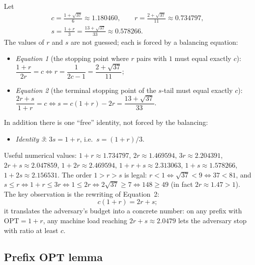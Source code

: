 \documentclass[11pt]{article}
\theoremstyle{definition}
\newcommand{\opt}{\mathrm{OPT}}
\begin{document}
Let
\begin{gather*}
c=\frac{1+\sqrt{37}}{6}\approx1.180460,\qquad
r=\frac{2+\sqrt{37}}{11}\approx0.734797,\\
s=\frac{1+r}{3}=\frac{13+\sqrt{37}}{33}\approx0.578266 .
\end{gather*}
The values of $r$ and $s$ are not guessed; each is forced by a balancing
equation:
\begin{itemize}
\item \emph{Equation 1} (the stopping point where $r$ pairs with $1$ must
equal exactly $c$):
$\dfrac{1+r}{2r}=c\iff r=\dfrac{1}{2c-1}=\dfrac{2+\sqrt{37}}{11}$;
\item \emph{Equation 2} (the terminal stopping point of the $s$-tail must
equal exactly $c$):
$\dfrac{2r+s}{1+r}=c\iff s=c(1+r)-2r=\dfrac{13+\sqrt{37}}{33}$.
\end{itemize}
In addition there is one ``free'' identity, not forced by the balancing:
\begin{itemize}
\item \emph{Identity 3}: $3s=1+r$, i.e.\ $s=(1+r)/3$.
\end{itemize}
Useful numerical values:
$1+r\approx1.734797$, $2r\approx1.469594$, $3r\approx2.204391$,
$2r+s\approx2.047859$, $1+2r\approx2.469594$, $1+r+s\approx2.313063$,
$1+s\approx1.578266$, $1+2s\approx2.156531$.
The order $1>r>s$ is legal: $r<1\iff\sqrt{37}<9\iff37<81$, and
$s\le r\iff1+r\le3r\iff1\le2r\iff2\sqrt{37}\ge7\iff148\ge49$ (in fact
$2r\approx1.47>1$). The key observation is the rewriting of Equation~2:
\begin{equation}
\label{eq:key}
c(1+r)=2r+s ;
\end{equation}
it translates the adversary's budget into a concrete number: on any prefix
with $\opt=1+r$, any machine load reaching $2r+s\approx2.0479$ lets the
adversary stop with ratio at least $c$.

\subsection{Prefix OPT lemma}
\end{document}
